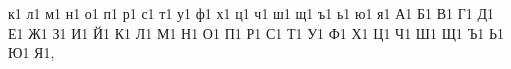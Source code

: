{             {к}{{\cyrk}}1 {л}{{\cyrl}}1 {м}{{\cyrm}}1 {н}{{\cyrn}}1 {о}{{\cyro}}1
             {п}{{\cyrp}}1 {р}{{\cyrr}}1 {с}{{\cyrs}}1 {т}{{\cyrt}}1 {у}{{\cyru}}1
             {ф}{{\cyrf}}1 {х}{{\cyrh}}1 {ц}{{\cyrc}}1 {ч}{{\cyrch}}1 {ш}{{\cyrsh}}1
             {щ}{{\cyrshch}}1 {ъ}{{\cyrhrdsn}}1 {ь}{{\cyrsftsn}}1 {ю}{{\cyryu}}1 {я}{{\cyrya}}1
             {А}{{\CYRA}}1 {Б}{{\CYRB}}1 {В}{{\CYRV}}1 {Г}{{\CYRG}}1 {Д}{{\CYRD}}1
             {Е}{{\CYRE}}1 {Ж}{{\CYRZH}}1 {З}{{\CYRZ}}1 {И}{{\CYRI}}1 {Й}{{\CYRISHRT}}1
             {К}{{\CYRK}}1 {Л}{{\CYRL}}1 {М}{{\CYRM}}1 {Н}{{\CYRN}}1 {О}{{\CYRO}}1
             {П}{{\CYRP}}1 {Р}{{\CYRR}}1 {С}{{\CYRS}}1 {Т}{{\CYRT}}1 {У}{{\CYRU}}1
             {Ф}{{\CYRF}}1 {Х}{{\CYRH}}1 {Ц}{{\CYRC}}1 {Ч}{{\CYRCH}}1 {Ш}{{\CYRSH}}1
             {Щ}{{\CYRSHCH}}1 {Ъ}{{\CYRHRDSN}}1 {Ь}{{\CYRSFTSN}}1 {Ю}{{\CYRYU}}1 {Я}{{\CYRYA}}1,
}
